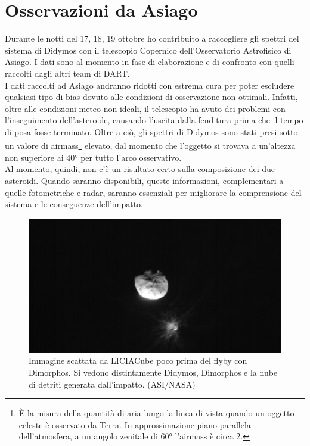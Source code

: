 \documentclass[a4paper,11pt,openright]{book}
\begin{document}
\section{Osservazioni da Asiago}
Durante le notti del 17, 18, 19 ottobre ho contribuito a raccogliere gli spettri del sistema di Didymos con il telescopio Copernico dell'Osservatorio Astrofisico di Asiago. I dati sono al momento in fase di elaborazione e di confronto con quelli raccolti dagli altri team di DART.\\
I dati raccolti ad Asiago andranno ridotti con estrema cura per poter escludere qualsiasi tipo di bias dovuto alle condizioni di osservazione non ottimali. Infatti, oltre alle condizioni meteo non ideali, il telescopio ha avuto dei problemi con l'inseguimento dell'asteroide, causando l'uscita dalla fenditura prima che il tempo di posa fosse terminato. Oltre a ciò, gli spettri di Didymos sono stati presi sotto un valore di airmass\footnote{È la misura della quantità di aria lungo la linea di vista quando un oggetto celeste è osservato da Terra. In approssimazione piano-parallela dell'atmosfera, a un angolo zenitale di 60° l'airmass è circa 2.} elevato, dal momento che l'oggetto si trovava a un'altezza non superiore ai 40° per tutto l'arco osservativo.\\
Al momento, quindi, non c'è un risultato certo sulla composizione dei due asteroidi. Quando saranno disponibili, queste informazioni, complementari a quelle fotometriche e radar, saranno essenziali per migliorare la comprensione del sistema e le conseguenze dell'impatto.


\begin{figure}
    \centering
    \includegraphics[width=\textwidth]{figure/liciacube_impact_1.png}
    \caption[Immagine scattata da LICIACube poco prima del flyby con Dimorphos.]{Immagine scattata da LICIACube poco prima del flyby con Dimorphos. Si vedono distintamente Didymos, Dimorphos e la nube di detriti generata dall'impatto. (ASI/NASA)}
    \label{fig:liciacube_impact_1}
\end{figure}
\end{document}
